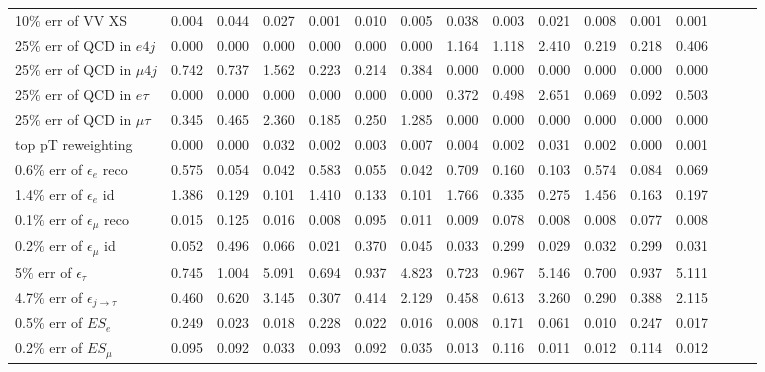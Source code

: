 \begin{tabular}{|l|ccc|ccc|ccc|ccc|ccc|}
      10$\%$ err of VV XS                        & 0.004 & 0.044 & 0.027 & 0.001 & 0.010 & 0.005 & 0.038 & 0.003 & 0.021 & 0.008 & 0.001 & 0.001 \\ 
      25$\%$ err of QCD in $e 4j$                & 0.000 & 0.000 & 0.000 & 0.000 & 0.000 & 0.000 & 1.164 & 1.118 & 2.410 & 0.219 & 0.218 & 0.406 \\ 
      25$\%$ err of QCD in $\mu 4j$              & 0.742 & 0.737 & 1.562 & 0.223 & 0.214 & 0.384 & 0.000 & 0.000 & 0.000 & 0.000 & 0.000 & 0.000 \\ 
      25$\%$ err of QCD in $e\tau$               & 0.000 & 0.000 & 0.000 & 0.000 & 0.000 & 0.000 & 0.372 & 0.498 & 2.651 & 0.069 & 0.092 & 0.503 \\ 
      25$\%$ err of QCD in $\mu\tau$             & 0.345 & 0.465 & 2.360 & 0.185 & 0.250 & 1.285 & 0.000 & 0.000 & 0.000 & 0.000 & 0.000 & 0.000 \\ 
      top pT reweighting                         & 0.000 & 0.000 & 0.032 & 0.002 & 0.003 & 0.007 & 0.004 & 0.002 & 0.031 & 0.002 & 0.000 & 0.001 \\ 
      0.6$\%$ err of $\epsilon_e$ reco           & 0.575 & 0.054 & 0.042 & 0.583 & 0.055 & 0.042 & 0.709 & 0.160 & 0.103 & 0.574 & 0.084 & 0.069 \\ 
      1.4$\%$ err of $\epsilon_e$ id             & 1.386 & 0.129 & 0.101 & 1.410 & 0.133 & 0.101 & 1.766 & 0.335 & 0.275 & 1.456 & 0.163 & 0.197 \\ 
      0.1$\%$ err of $\epsilon_\mu$ reco         & 0.015 & 0.125 & 0.016 & 0.008 & 0.095 & 0.011 & 0.009 & 0.078 & 0.008 & 0.008 & 0.077 & 0.008 \\ 
      0.2$\%$ err of $\epsilon_\mu$ id           & 0.052 & 0.496 & 0.066 & 0.021 & 0.370 & 0.045 & 0.033 & 0.299 & 0.029 & 0.032 & 0.299 & 0.031 \\ 
      5$\%$ err of $\epsilon_\tau$               & 0.745 & 1.004 & 5.091 & 0.694 & 0.937 & 4.823 & 0.723 & 0.967 & 5.146 & 0.700 & 0.937 & 5.111 \\ 
      4.7$\%$ err of $\epsilon_{j\to\tau}$       & 0.460 & 0.620 & 3.145 & 0.307 & 0.414 & 2.129 & 0.458 & 0.613 & 3.260 & 0.290 & 0.388 & 2.115 \\ 
      0.5$\%$ err of $ES_{e}$                    & 0.249 & 0.023 & 0.018 & 0.228 & 0.022 & 0.016 & 0.008 & 0.171 & 0.061 & 0.010 & 0.247 & 0.017 \\ 
      0.2$\%$ err of $ES_{\mu}$                  & 0.095 & 0.092 & 0.033 & 0.093 & 0.092 & 0.035 & 0.013 & 0.116 & 0.011 & 0.012 & 0.114 & 0.012 \\ 

\end{tabular}
